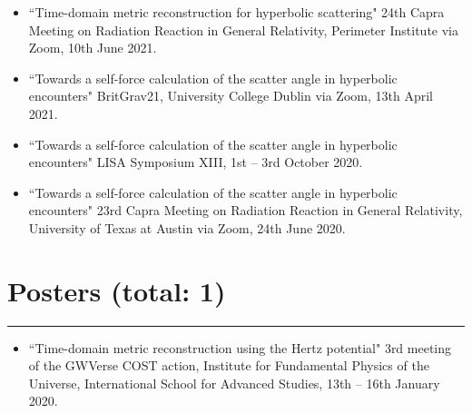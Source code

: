 \documentclass[10.5pt, oneside]{article}   	%
\begin{document}
\begin{itemize}
\item ``Time-domain metric reconstruction for hyperbolic scattering" 24th Capra Meeting on Radiation Reaction in General Relativity, Perimeter Institute via Zoom, 10th June 2021. \href{https://pirsa.org/21060058}{}
\item ``Towards a self-force calculation of the scatter angle in hyperbolic encounters" BritGrav21, University College Dublin via Zoom, 13th April 2021. \href{https://oliverlong.info/talks/britgrav21}{}
\item``Towards a self-force calculation of the scatter angle in hyperbolic encounters" LISA Symposium XIII, 1st -- 3rd October 2020. \href{https://lisasymposium13.lisamission.org/presentations/i0xMnRFWi7WKbO5f01caGDH0zPK2/7qz7uYC3qHuzj9AsC49h}{}
\item ``Towards a self-force calculation of the scatter angle in hyperbolic encounters" 23rd Capra Meeting on Radiation Reaction in General Relativity, University of Texas at Austin via Zoom, 24th June 2020. \href{https://www.youtube.com/watch?v=HB-Rw5kRUfg&t=11311s}{}
\end{itemize} 
 
{\color{Sectioncolour}
\section*{Posters {\rm (total: 1)}}
\vspace{-3mm}
\noindent\rule{\linewidth}{0.6pt}}
\begin{itemize}
\item ``Time-domain metric reconstruction using the Hertz potential" 3rd meeting of the GWVerse COST action, Institute for Fundamental Physics of the Universe, International School for Advanced Studies, 13th -- 16th January 2020.
\end{itemize} 

 
\end{document}
